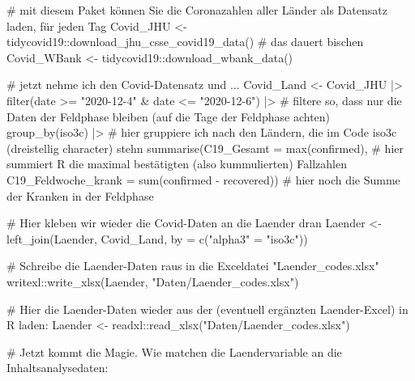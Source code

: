 \documentclass[twoside, pagesize, fontsize=11pt, dvipsnames]{scrreport}
\newenvironment{Shaded}{\begin{snugshade}}{\end{snugshade}}
\newcommand{\AttributeTok}[1]{\textcolor[rgb]{0.40,0.45,0.13}{#1}}
\newcommand{\CommentTok}[1]{\textcolor[rgb]{0.37,0.37,0.37}{#1}}
\newcommand{\FunctionTok}[1]{\textcolor[rgb]{0.28,0.35,0.67}{#1}}
\newcommand{\NormalTok}[1]{\textcolor[rgb]{0.00,0.23,0.31}{#1}}
\newcommand{\OtherTok}[1]{\textcolor[rgb]{0.00,0.23,0.31}{#1}}
\newcommand{\SpecialCharTok}[1]{\textcolor[rgb]{0.37,0.37,0.37}{#1}}
\newcommand{\StringTok}[1]{\textcolor[rgb]{0.13,0.47,0.30}{#1}}
\begin{document}
\begin{Shaded}
\begin{Highlighting}[]
\CommentTok{\# mit diesem Paket können Sie die Coronazahlen aller Länder als Datensatz laden, für jeden Tag}
\NormalTok{Covid\_JHU }\OtherTok{\textless{}{-}}\NormalTok{ tidycovid19}\SpecialCharTok{::}\FunctionTok{download\_jhu\_csse\_covid19\_data}\NormalTok{() }\CommentTok{\# das dauert bischen}
\NormalTok{Covid\_WBank }\OtherTok{\textless{}{-}}\NormalTok{ tidycovid19}\SpecialCharTok{::}\FunctionTok{download\_wbank\_data}\NormalTok{()}

\CommentTok{\# jetzt nehme ich den Covid{-}Datensatz und ...}
\NormalTok{Covid\_Land }\OtherTok{\textless{}{-}}\NormalTok{ Covid\_JHU }\SpecialCharTok{|\textgreater{}} 
  \FunctionTok{filter}\NormalTok{(date }\SpecialCharTok{\textgreater{}=} \StringTok{"2020{-}12{-}4"} \SpecialCharTok{\&}\NormalTok{ date }\SpecialCharTok{\textless{}=} \StringTok{"2020{-}12{-}6"}\NormalTok{) }\SpecialCharTok{|\textgreater{}} \CommentTok{\# filtere so, dass nur die Daten der Feldphase bleiben (auf die Tage der Feldphase achten)}
  \FunctionTok{group\_by}\NormalTok{(iso3c) }\SpecialCharTok{|\textgreater{}} \CommentTok{\# hier gruppiere ich nach den Ländern, die im Code iso3c (dreistellig character) stehn}
  \FunctionTok{summarise}\NormalTok{(}\AttributeTok{C19\_Gesamt =} \FunctionTok{max}\NormalTok{(confirmed), }\CommentTok{\# hier summiert R die maximal bestätigten (also kummulierten) Fallzahlen}
            \AttributeTok{C19\_Feldwoche\_krank =} \FunctionTok{sum}\NormalTok{(confirmed }\SpecialCharTok{{-}}\NormalTok{ recovered)) }\CommentTok{\# hier noch die Summe der Kranken in der Feldphase}

\CommentTok{\# Hier kleben wir wieder die Covid{-}Daten an die Laender dran}
\NormalTok{Laender }\OtherTok{\textless{}{-}} \FunctionTok{left\_join}\NormalTok{(Laender, Covid\_Land, }\AttributeTok{by =} \FunctionTok{c}\NormalTok{(}\StringTok{"alpha3"} \OtherTok{=} \StringTok{"iso3c"}\NormalTok{)) }

\CommentTok{\# Schreibe die Laender{-}Daten raus in die Exceldatei "Laender\_codes.xlsx"}
\NormalTok{writexl}\SpecialCharTok{::}\FunctionTok{write\_xlsx}\NormalTok{(Laender, }\StringTok{"Daten/Laender\_codes.xlsx"}\NormalTok{)}

\CommentTok{\# Hier die Laender{-}Daten wieder aus der (eventuell ergänzten Laender{-}Excel) in R laden:}
\NormalTok{Laender }\OtherTok{\textless{}{-}}\NormalTok{ readxl}\SpecialCharTok{::}\FunctionTok{read\_xlsx}\NormalTok{(}\StringTok{"Daten/Laender\_codes.xlsx"}\NormalTok{)}

\CommentTok{\# Jetzt kommt die Magie. Wie matchen die Laendervariable an die Inhaltsanalysedaten:}


\end{Highlighting}
\end{Shaded}
\end{document}
